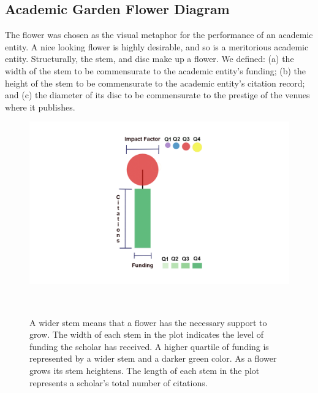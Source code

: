 \subsection {Academic Garden Flower Diagram}

The flower was chosen as the visual metaphor for the performance of an academic entity. A nice looking flower is highly desirable, and so is a meritorious academic entity. Structurally, the stem, and disc make up a flower. We defined: (a) the width of the stem to be commensurate to the academic entity's funding; (b) the height of the stem to be commensurate to the academic entity's citation record; and (c) the diameter of its disc to be commensurate to the prestige of the venues where it publishes. 
\begin{figure}[H]
    \centering
    \includegraphics[width=1\textwidth]{figures/fig-flower.png}
    \caption{A wider stem means that a flower has the necessary support to grow. The width of each stem in the plot indicates the level of funding the scholar has received. A higher quartile of funding is represented by a wider stem and a darker green color. As a flower grows its stem heightens. The length of each stem in the plot represents a scholar's total number of citations.}~\label{fig-flower-diagram}
\end{figure}


